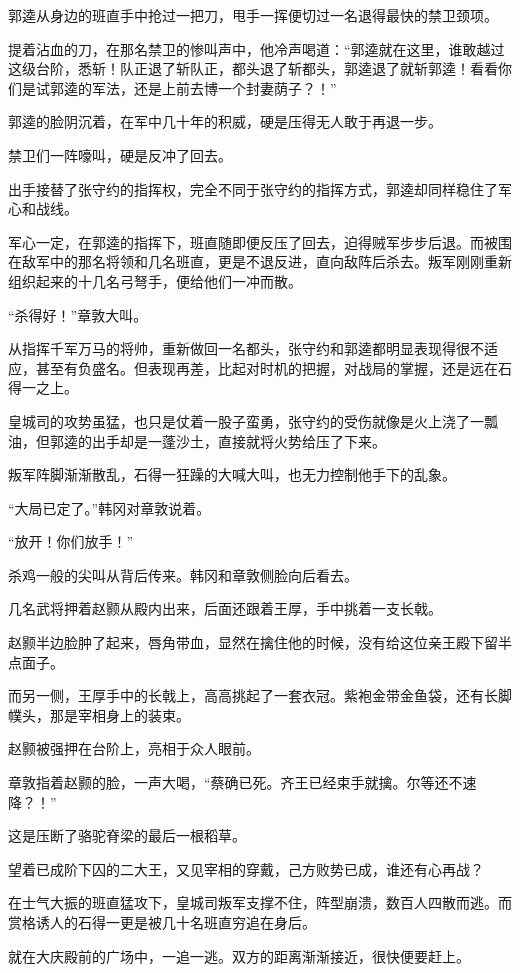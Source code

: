 郭逵从身边的班直手中抢过一把刀，甩手一挥便切过一名退得最快的禁卫颈项。

提着沾血的刀，在那名禁卫的惨叫声中，他冷声喝道：“郭逵就在这里，谁敢越过这级台阶，悉斩！队正退了斩队正，都头退了斩都头，郭逵退了就斩郭逵！看看你们是试郭逵的军法，还是上前去博一个封妻荫子？！”

郭逵的脸阴沉着，在军中几十年的积威，硬是压得无人敢于再退一步。

禁卫们一阵嚎叫，硬是反冲了回去。

出手接替了张守约的指挥权，完全不同于张守约的指挥方式，郭逵却同样稳住了军心和战线。

军心一定，在郭逵的指挥下，班直随即便反压了回去，迫得贼军步步后退。而被围在敌军中的那名将领和几名班直，更是不退反进，直向敌阵后杀去。叛军刚刚重新组织起来的十几名弓弩手，便给他们一冲而散。

“杀得好！”章敦大叫。

从指挥千军万马的将帅，重新做回一名都头，张守约和郭逵都明显表现得很不适应，甚至有负盛名。但表现再差，比起对时机的把握，对战局的掌握，还是远在石得一之上。

皇城司的攻势虽猛，也只是仗着一股子蛮勇，张守约的受伤就像是火上浇了一瓢油，但郭逵的出手却是一蓬沙土，直接就将火势给压了下来。

叛军阵脚渐渐散乱，石得一狂躁的大喊大叫，也无力控制他手下的乱象。

“大局已定了。”韩冈对章敦说着。

“放开！你们放手！”

杀鸡一般的尖叫从背后传来。韩冈和章敦侧脸向后看去。

几名武将押着赵颢从殿内出来，后面还跟着王厚，手中挑着一支长戟。

赵颢半边脸肿了起来，唇角带血，显然在擒住他的时候，没有给这位亲王殿下留半点面子。

而另一侧，王厚手中的长戟上，高高挑起了一套衣冠。紫袍金带金鱼袋，还有长脚幞头，那是宰相身上的装束。

赵颢被强押在台阶上，亮相于众人眼前。

章敦指着赵颢的脸，一声大喝，“蔡确已死。齐王已经束手就擒。尔等还不速降？！”

这是压断了骆驼脊梁的最后一根稻草。

望着已成阶下囚的二大王，又见宰相的穿戴，己方败势已成，谁还有心再战？

在士气大振的班直猛攻下，皇城司叛军支撑不住，阵型崩溃，数百人四散而逃。而赏格诱人的石得一更是被几十名班直穷追在身后。

就在大庆殿前的广场中，一追一逃。双方的距离渐渐接近，很快便要赶上。

